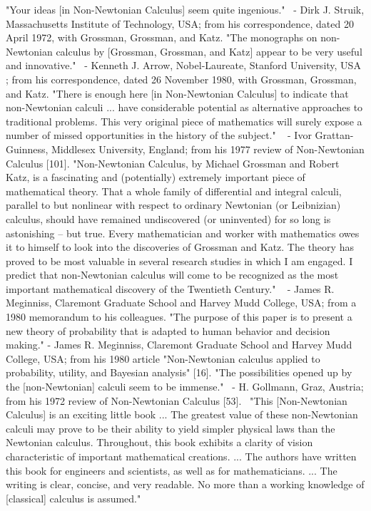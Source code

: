 \documentclass[12pt]{article}
\begin{document}
"Your ideas [in Non-Newtonian Calculus] seem quite ingenious."
 - Dirk J. Struik, Massachusetts Institute of Technology, USA; from his correspondence, dated 20 April 1972, with Grossman, Grossman, and Katz.
"The monographs on non-Newtonian calculus by [Grossman, Grossman, and Katz] appear to be very useful and innovative."  - Kenneth J. Arrow, Nobel-Laureate, Stanford University, USA ; from his correspondence, dated 26 November 1980, with Grossman, Grossman, and Katz.
"There is enough here [in Non-Newtonian Calculus] to indicate that non-Newtonian calculi ... have considerable potential as alternative approaches to traditional problems. This very original piece of mathematics will surely expose a number of missed opportunities in the history of the subject."   - Ivor Grattan-Guinness, Middlesex University, England; from his 1977 review of Non-Newtonian Calculus [101].
"Non-Newtonian Calculus, by Michael Grossman and Robert Katz, is a fascinating and (potentially) extremely important piece of mathematical theory. That a whole family of differential and integral calculi, parallel to but nonlinear with respect to ordinary Newtonian (or Leibnizian) calculus, should have remained undiscovered (or uninvented) for so long is astonishing -- but true. Every mathematician and worker with mathematics owes it to himself to look into the discoveries of Grossman and Katz. The theory has proved to be most valuable in several research studies in which I am engaged. I predict that non-Newtonian calculus will come to be recognized as the most important mathematical discovery of the Twentieth Century."   - James R. Meginniss, Claremont Graduate School and Harvey Mudd College, USA; from a 1980 memorandum to his colleagues.
"The purpose of this paper is to present a new theory of probability that is adapted to human behavior and decision making."
 -  James R. Meginniss, Claremont Graduate School and Harvey Mudd College, USA; from his 1980 article "Non-Newtonian calculus applied to probability, utility, and Bayesian analysis" [16].
"The possibilities opened up by the [non-Newtonian] calculi seem to be immense."  - H. Gollmann, Graz, Austria; from his 1972 review of Non-Newtonian Calculus [53].
 "This [Non-Newtonian Calculus] is an exciting little book ... The greatest value of these non-Newtonian calculi may prove to be their ability to yield simpler physical laws than the Newtonian calculus. Throughout, this book exhibits a clarity of vision characteristic of important mathematical creations. ... The authors have written this book for engineers and scientists, as well as for mathematicians. ... The writing is clear, concise, and very readable. No more than a working knowledge of [classical] calculus is assumed."
\end{document}
